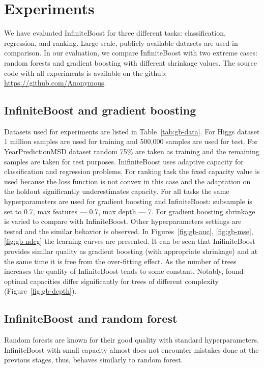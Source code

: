 \section{Experiments}
We have evaluated InfiniteBoost for three different tasks: classification, regression, and ranking. 
Large scale, publicly available datasets are used in comparison. 
In our evaluation, we compare InfiniteBoost with two extreme cases: random forests and gradient boosting with different shrinkage values.
The source code with all experiments is available on the github: \url{https://github.com/Anonymous}.

\insertplotsgbarxiv
\insertplotsforestarxiv

\subsection{InfiniteBoost and gradient boosting}
Datasets used for experiments are listed in Table~\ref{tab:gb-data}. 
For Higgs dataset 1 million samples are used for training and 500,000 samples are used for test. 
For YearPredictionMSD dataset random 75\% are taken as training and the remaining samples are taken for test purposes.
InifiniteBoost uses adaptive capacity for classification and regression problems.
For ranking task the fixed capacity value is used because the loss function is not convex in this case and the adaptation on the holdout significantly underestimates capacity.
For all tasks the same hyperparameters are used for gradient boosting and InfiniteBoost: subsample is set to 0.7, max features --- 0.7, max depth --- 7. 
For gradient boosting shrinkage is varied to compare with InfiniteBoost.
Other hyperparameters settings are tested and the similar behavior is observed.
In Figures~\ref{fig:gb-auc}, \ref{fig:gb-mse}, \ref{fig:gb-ndcg} the learning curves are presented.
It can be seen that InifiniteBoost provides similar quality as gradient boosting (with appropriate shrinkage) and at the same time it is free from the over-fitting effect. 
As the number of trees increases the quality of InfiniteBoost tends to some constant.
Notably, found optimal capacities differ significantly for trees of different complexity (Figure~\ref{fig:gb-depth}).

\insertplotsgbnips

\subsection{InfiniteBoost and random forest}
Random forests are known for their good quality with standard hyperparameters.
InfiniteBoost with small capacity almost does not encounter mistakes done at the previous stages,
thus, behaves similarly to random forest.


